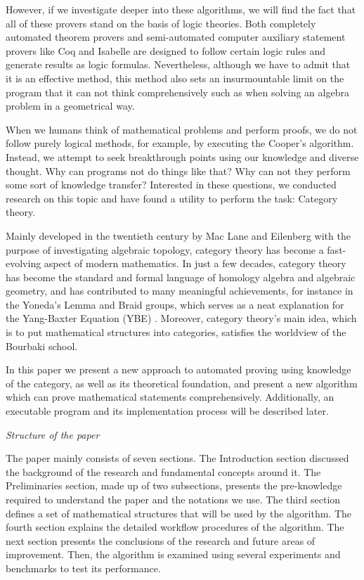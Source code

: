 \documentclass{aims}
\numberwithin{equation}{section}
\numberwithin{theorem}{section}	%
\numberwithin{axiom}{section}	%
\numberwithin{definition}{section}	%
\begin{document}
	However, if we investigate deeper into these algorithms, we will find the fact that all of these provers stand on the basis of logic theories. Both completely automated theorem provers and semi-automated computer auxiliary statement provers like Coq and Isabelle are designed to follow certain logic rules and generate results as logic formulas. Nevertheless, although we have to admit that it is an effective method, this method also sets an insurmountable limit on the program that it can not think comprehensively such as when solving an algebra problem in a geometrical way.
	
	When we humans think of mathematical problems and perform proofs, we do not follow purely logical methods, for example, by executing the Cooper{'}s algorithm. Instead, we attempt to seek breakthrough points using our knowledge and diverse thought. Why can programs not do things like that? Why can not they perform some sort of knowledge transfer? Interested in these questions, we conducted research on this topic and have found a utility to perform the task: Category theory.
	
	Mainly developed in the twentieth century by Mac Lane and Eilenberg with the purpose of investigating algebraic topology, category theory has become a fast-evolving aspect of modern mathematics. In just a few decades, category theory has become the standard and formal language of homology algebra and algebraic geometry, and has contributed to many meaningful achievements, for instance in the Yoneda{'}s Lemma and Braid groups, which serves as a neat explanation for the Yang-Baxter Equation (YBE) \cite{Li2019}. Moreover, category theory{'}s main idea, which is to put mathematical structures into categories, satisfies the worldview of the Bourbaki school\cite{Li2019}.
	
	In this paper we present a new approach to automated proving using knowledge of the category, as well as its theoretical foundation, and present a new algorithm which can prove mathematical statements comprehensively. Additionally, an executable program and its implementation process will be described later.
	
\noindent	\textit{ Structure of the paper}

	The paper mainly consists of seven sections. The Introduction section discussed the background of the research and fundamental concepts around it. The Preliminaries section, made up of two subsections, presents the pre-knowledge required to understand the paper and the notations we use. The third section defines a set of mathematical structures that will be used by the algorithm. The fourth section explains the detailed workflow procedures of the algorithm. The next section presents the conclusions of the research and future areas of improvement. Then, the algorithm is examined using several experiments and benchmarks to test its performance.
	
\end{document}

